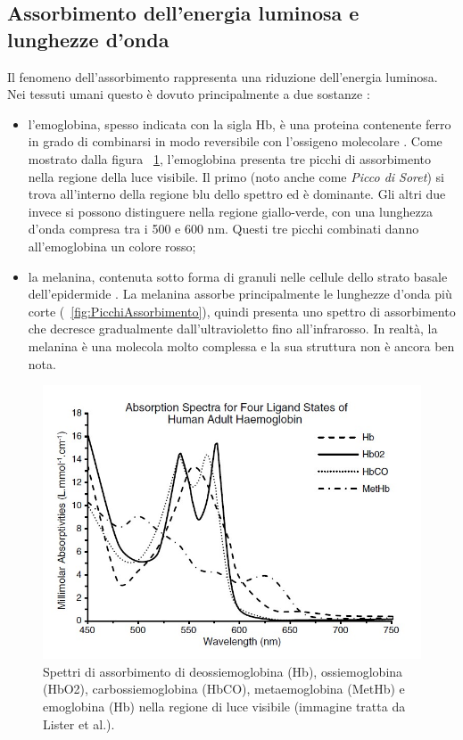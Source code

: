 \subsection{Assorbimento dell'energia luminosa e lunghezze d'onda}
Il fenomeno dell'assorbimento rappresenta una riduzione dell'energia luminosa. Nei tessuti umani questo è dovuto principalmente a due sostanze \cite{Lister2012}:
\begin{itemize}
\item l'emoglobina, spesso indicata con la sigla Hb, è una proteina contenente ferro in grado di combinarsi in modo reversibile con l’ossigeno molecolare \cite{SilverthornDeeUnglaub2020Fu:u}. Come mostrato dalla figura \Fig~\ref{fig:AssorbimentoEmolglobina}, l'emoglobina presenta tre picchi di assorbimento nella regione della luce visibile. Il primo (noto anche come \textit{Picco di Soret}) si trova all'interno della regione blu dello spettro ed è dominante. Gli altri due invece si possono distinguere nella regione giallo-verde, con una lunghezza d'onda compresa tra i 500 e 600 nm. Questi tre picchi combinati danno all'emoglobina un colore rosso;
\item la melanina, contenuta sotto forma di granuli nelle cellule dello strato basale dell’epidermide \cite{SilverthornDeeUnglaub2020Fu:u}. La melanina assorbe principalmente le lunghezze d'onda più corte (\Fig~\ref{fig:PicchiAssorbimento}), quindi presenta uno spettro di assorbimento che decresce gradualmente dall'ultravioletto fino all'infrarosso. In realtà, la melanina è una molecola molto complessa e la sua struttura non è ancora ben nota.
\end{itemize}
\begin{figure}[b]
	\centering
	\includegraphics[width=0.8\linewidth]{ImageFiles/Fotopletismografia/AssorbimentoEmolglobina}
	\caption{Spettri di assorbimento di deossiemoglobina (Hb), ossiemoglobina (HbO2), carbossiemoglobina (HbCO), metaemoglobina (MetHb) e emoglobina (Hb) nella regione di luce visibile (immagine tratta da Lister et al.\cite{Lister2012}).}
	\label{fig:AssorbimentoEmolglobina}
\end{figure}
